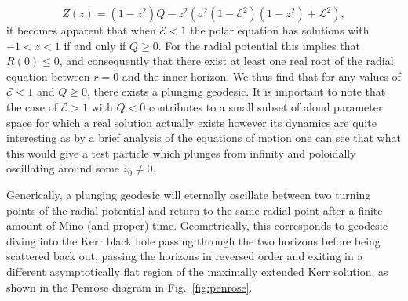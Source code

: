\documentclass[12pt, amsmath]{revtex4-2}
\newcommand\EN{\mathcal{E}}
\begin{document}
\begin{equation}
    Z(z) = (1-z^2)Q-z^2(a^2(1-\EN^2)(1-z^2) + \mathcal{L}^2),
\end{equation}
it becomes apparent that when $\EN<1$ the polar equation has solutions with $-1<z<1$ if and only if $Q\geq 0$. For the radial potential this implies that $R(0)\leq 0$, and consequently that there exist at least one real root of the radial equation between $r=0$ and the inner horizon. We thus find that for any values of $\EN<1$ and $Q\geq 0$, there exists a plunging geodesic. It is important to note that the case of $\EN>1$ with $Q<0$ contributes to a small subset of aloud parameter space for which a real solution actually exists however its dynamics are quite interesting as by a brief analysis of the equations of motion one can see that what this would give a test particle which plunges from infinity and poloidally oscillating around some $z_0 \neq 0$.


Generically, a plunging geodesic will eternally oscillate between two turning points of the radial potential and return to the same radial point after a finite amount of Mino (and proper) time. Geometrically, this corresponds to geodesic diving into the Kerr black hole passing through the two horizons before being scattered back out, passing the horizons in reversed order and exiting in a different asymptotically flat region of the maximally extended Kerr solution, as shown in the Penrose diagram in Fig.~\ref{fig:penrose}.
\end{document}
